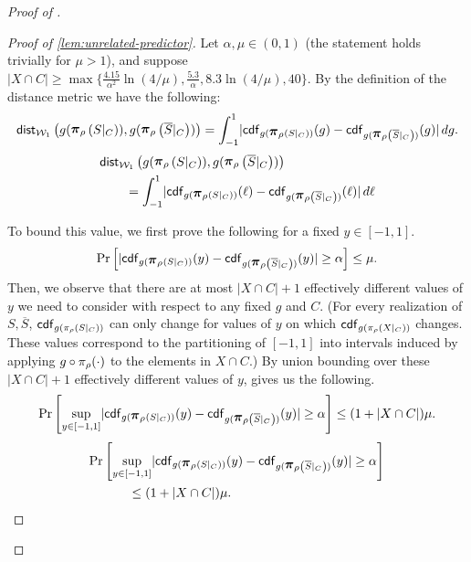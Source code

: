 \begin{proof}[Proof of ]
\begin{proof}[Proof of \cref{lem:unrelated-predictor}]
    
\noindent 
Let $\alpha, \mu \in (0, 1)$ (the statement holds trivially for $\mu > 1$), and suppose $|X\cap C|\ge \max\{\frac{4.15}{\alpha^2}\ln(4/\mu), \frac{5.3}{\alpha}, 8.3\ln(4/\mu), 40\}$. By the definition of the distance metric we have the following:
\ifnum{}
\begin{equation}\label{eq:wasserstein-integral}    \wdist\left(g(\restrict{S\lvert_C}{\selection}),g(\restrict{\overline{S}\lvert_C}{\selection})\right) = \int_{-1}^{1} \abs{\cdf_{g(\restrict{S\lvert_C}{\selection})}(g) - \cdf_{g(\restrict{\overline{S}\lvert_C}{\selection})}(g)} \,dg.
\end{equation}
\else
\begin{align}\label{eq:wasserstein-integral}
& \wdist\left(g(\restrict{S\lvert_C}{\selection}),g(\restrict{\overline{S}\lvert_C}{\selection})\right) \nonumber \\
   & \qquad = \int_{-1}^{1} \abs{\cdf_{g(\restrict{S\lvert_C}{\selection})}(\ell) - \cdf_{g(\restrict{\overline{S}\lvert_C}{\selection})}(\ell)} \,d \ell
\end{align}


\fi

To bound this value, we first prove the following for a fixed $y \in [-1,1]$.
\begin{equation}\label{eq:cdf-diffs-single-y}
    \Pr\left[|\cdf_{g(\restrict{S\lvert_C}{\selection})}(y) - \cdf_{g(\restrict{\overline{S}\lvert_C}{\selection})}(y)| \ge \alpha\right]\le \mu.
\end{equation}
Then, we observe that there are at most $|X \cap C|+1$ effectively different values of $y$ we need to consider with respect to any fixed $g$ and $C$. (For every realization of $S, \overline{S}$, $\mathsf{cdf}_{g(\pi_{\rho}(S|_C))}$ can only change for values of $y$ on which $\mathsf{cdf}_{g(\pi_{\rho}(X|_C))}$ changes. These values correspond to the partitioning of $[-1,1]$ into intervals induced by applying $g \circ \pi_{\rho}(\cdot)$ to the elements in $X \cap C$.) By union bounding over these $|X \cap C| + 1$ effectively different values of $y$, 
 gives us the following.
\ifnum{}
\begin{equation}\label{eq:supremum-of-cdf-diffs}
\Pr\left[\sup_{y\in[-1,1]}\abs{\cdf_{g(\restrict{S\lvert_C}{\selection})}(y) - \cdf_{g(\restrict{\overline{S}\lvert_C}{\selection})}(y)} \ge \alpha\right]\le (1+|X\cap C|)\mu.
\end{equation}
\else
\begin{align}\label{eq:supremum-of-cdf-diffs}
\Pr&\left[\sup_{y\in[-1,1]}\abs{\cdf_{g(\restrict{S\lvert_C}{\selection})}(y) - \cdf_{g(\restrict{\overline{S}\lvert_C}{\selection})}(y)} \ge \alpha\right] \nonumber \\
& \qquad \le (1+|X\cap C|)\mu.
\end{align}
\fi


\end{proof}
\end{proof}
